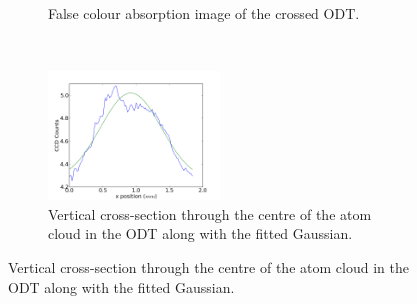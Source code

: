 \begin{figure}[h]
\centering
    \begin{subfigure}[b]{0.5\textwidth}\centering
{}
        \caption{False colour absorption image of the crossed ODT.}
    \end{subfigure}~~~\begin{subfigure}[b]{0.5\textwidth}\centering
\includegraphics[width=0.5\textwidth]{figs/ODTimage1x.png}
        \caption{Vertical cross-section through the centre of the atom cloud in the ODT along with the fitted Gaussian.}
    \end{subfigure}



\end{figure}
